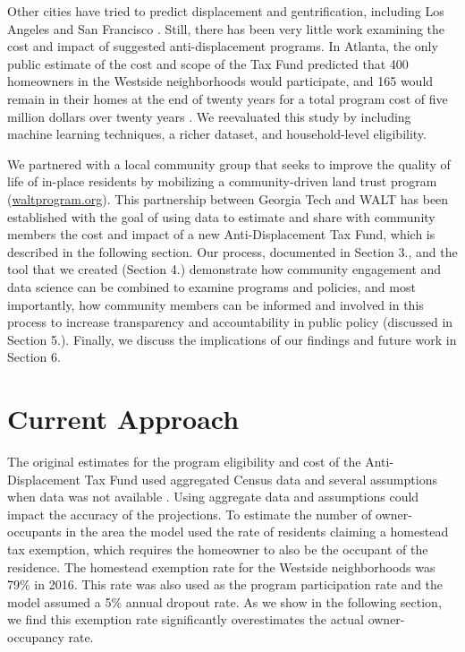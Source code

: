 \documentclass{acm_proc_article-sp}
\begin{document}
Other cities have tried to predict displacement and gentrification, including Los Angeles and San Francisco \cite{lait16,ud17}. Still, there has been very little work examining the cost and impact of suggested anti-displacement programs. In Atlanta, the only public estimate of the cost and scope of the Tax Fund predicted that 400 homeowners in the Westside neighborhoods would participate, and 165 would remain in their homes at the end of twenty years for a total program cost of five million dollars over twenty years \cite{bed17}. We reevaluated this study by including machine learning techniques, a richer dataset, and household-level eligibility.

We partnered with a local community group that seeks to improve the quality of life of in-place residents by mobilizing a community-driven land trust program (\href{http://waltprogram.org}{waltprogram.org}). This partnership between Georgia Tech and WALT has been established with the goal of using data to estimate and share with community members the cost and impact of a new Anti-Displacement Tax Fund, which is described in the following section. Our process, documented in Section 3., and the tool that we created (Section 4.) demonstrate how community engagement and data science can be combined to examine programs and policies, and most importantly, how community members can be informed and involved in this process to increase transparency and accountability in public policy (discussed in Section 5.). Finally, we discuss the implications of our findings and future work in Section 6.

\section{Current Approach}

The original estimates for the program eligibility and cost of the Anti-Displacement Tax Fund used aggregated Census data and several assumptions when data was not available \cite{bed17}. Using aggregate data and assumptions could impact the accuracy of the projections. To estimate the number of owner-occupants in the area the model used the rate of residents claiming a homestead tax exemption, which requires the homeowner to also be the occupant of the residence. The homestead exemption rate for the Westside neighborhoods was 79\% in 2016. This rate was also used as the program participation rate and the model assumed a 5\% annual dropout rate. As we show in the following section, we find this exemption rate significantly overestimates the actual owner-occupancy rate.
\end{document}
